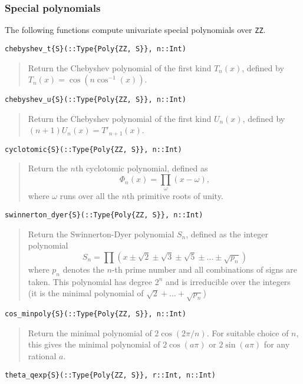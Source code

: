 \documentclass[a4paper,10pt]{article}
\newcommand{\code}{\lstinline}
\newcommand{\desc}[1]{\vspace{-3mm}\begin{quote}#1\end{quote}}
\begin{document}
{{{\subsubsection{Special polynomials}

The following functions compute univariate special polynomials over \code{ZZ}.

\begin{lstlisting}
chebyshev_t{S}(::Type{Poly{ZZ, S}}, n::Int)
\end{lstlisting}

\desc{Return the Chebyshev polynomial of the first kind $T_n(x)$, defined by 
$T_n(x) = \cos(n \cos^{-1}(x))$.}

\begin{lstlisting}
chebyshev_u{S}(::Type{Poly{ZZ, S}}, n::Int)
\end{lstlisting}

\desc{Return the Chebyshev polynomial of the first kind $U_n(x)$, defined by 
$(n+1) U_n(x) = T'_{n+1}(x)$.}

\begin{lstlisting}
cyclotomic{S}(::Type{Poly{ZZ, S}}, n::Int)
\end{lstlisting}

\desc{Return the $n$th cyclotomic polynomial, defined as
$$\Phi_n(x) = \prod_{\omega} (x-\omega),$$ where $\omega$ runs over all the 
$n$th primitive roots of unity.}

\begin{lstlisting}
swinnerton_dyer{S}(::Type{Poly{ZZ, S}}, n::Int)
\end{lstlisting}

\desc{Return the Swinnerton-Dyer polynomial $S_n$, defined as the integer 
polynomial $$S_n = \prod (x \pm \sqrt{2} \pm \sqrt{3}
\pm \sqrt{5} \pm \ldots \pm \sqrt{p_n})$$ where $p_n$ denotes the $n$-th prime 
number and all combinations of signs are taken. This polynomial has degree $2^n$
and is irreducible over the integers (it is the minimal polynomial of 
$\sqrt{2} + \ldots + \sqrt{p_n}$)}

\begin{lstlisting}
cos_minpoly{S}(::Type{Poly{ZZ, S}}, n::Int)
\end{lstlisting}

\desc{Return the minimal polynomial of $2 \cos(2 \pi / n)$. For suitable choice of 
$n$, this gives the minimal polynomial of $2 \cos(a \pi)$ or $2 \sin(a \pi)$ for any
rational $a$.}

\begin{lstlisting}
theta_qexp{S}(::Type{Poly{ZZ, S}}, r::Int, n::Int)
\end{lstlisting}

}}}
\end{document}

